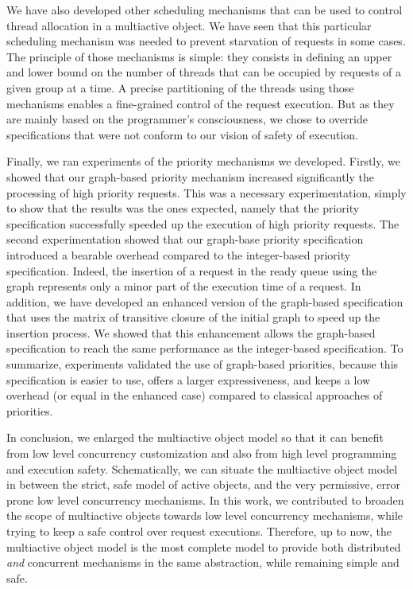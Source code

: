 \documentclass[11pt]{report}
\begin{document}
We have also developed other scheduling mechanisms that can be used to control thread allocation in a multiactive object. We have seen that this particular scheduling mechanism was needed to prevent starvation of requests in some cases. The principle of those mechanisms is simple: they consists in defining an upper and lower bound on the number of threads that can be occupied by requests of a given group at a time. A precise partitioning of the threads using those mechanisms enables a fine-grained control of the request execution. But as they are mainly based on the programmer's consciousness, we chose to override specifications that were not conform to our vision of safety of execution.

Finally, we ran experiments of the priority mechanisms we developed. Firstly, we showed that our graph-based priority mechanism increased significantly the processing of high priority requests. This was a necessary experimentation, simply to show that the results was the ones expected, namely that the priority specification successfully speeded up the execution of high priority requests. The second experimentation showed that our graph-base priority specification introduced a bearable overhead compared to the integer-based priority specification. Indeed, the insertion of a request in the ready queue using the graph represents only a minor part of the execution time of a request. In addition, we have developed an enhanced version of the graph-based specification that uses the matrix of transitive closure of the initial graph to speed up the insertion process. We showed that this enhancement allows the graph-based specification to reach the same performance as the integer-based specification. To summarize, experiments validated the use of graph-based priorities, because this specification is easier to use, offers a larger expressiveness, and keeps a low overhead (or equal in the enhanced case) compared to classical approaches of priorities. 


In conclusion, we enlarged the multiactive object model so that it can benefit from low level concurrency customization and also from high level programming and execution safety. Schematically, we can situate the multiactive object model in between the strict, safe model of active objects, and the very permissive, error prone low level concurrency mechanisms. In this work, we contributed to broaden the scope of multiactive objects towards low level concurrency mechanisms, while trying to keep a safe control over request executions. Therefore, up to now, the multiactive object model is the most complete model to provide both distributed \emph{and} concurrent mechanisms in the same abstraction, while remaining simple and safe.
\end{document}
